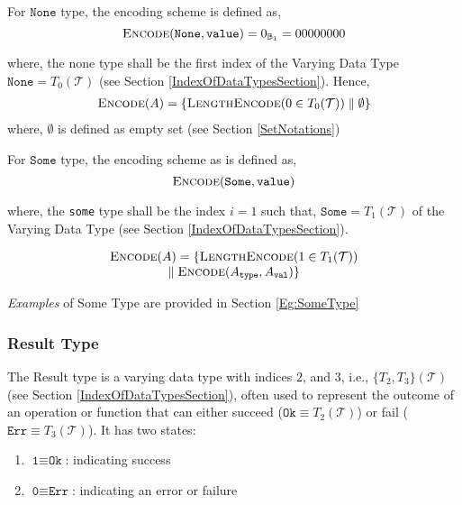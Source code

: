 \documentclass[../alan-handbook.tex]{subfiles}
\begin{document}
\label{NoneType}

For $\texttt{None}$ type, the encoding scheme is defined as,
$$\Call{Encode}{\texttt{None},\texttt{value}} = 0_{\mathbb{B}_1} = 00000000 $$

where, the none type shall be the first index of the Varying Data Type $\texttt{None} = T_0(\mathcal{T})$ (see Section \ref{IndexOfDataTypesSection}). Hence,
$$
\begin{matrix}
    \Call{Encode}{A} = \{\Call{LengthEncode}{0 \in T_0(\mathcal{T})} \parallel \emptyset\}
\end{matrix}
$$
where, $\emptyset$ is defined as empty set (see Section \ref{SetNotations})

\label{SomeType}

For $\texttt{Some}$ type, the encoding scheme as is defined as,
$$\Call{Encode}{\texttt{Some},\texttt{value}}$$

where, the \texttt{some} type shall be the index $i=1$ such that, $\texttt{Some} = T_1(\mathcal{T})$ of the Varying Data Type (see Section \ref{IndexOfDataTypesSection}). 

$$
\begin{matrix}
    \Call{Encode}{A} = \{\Call{LengthEncode}{1 \in T_{1}(\mathcal{T})} \\
    \parallel \Call{Encode}{A_{\texttt{type}},A_{\texttt{val}}}\}
\end{matrix}
$$

\textit{Examples} of Some Type are provided in Section \ref{Eg:SomeType}

\subsubsection{Result Type} 
\label{ResultType}

The Result type is a varying data type with indices $2$, and $3$, i.e., $\{T_2, T_3\}(\mathcal{T})$ (see Section \ref{IndexOfDataTypesSection}), often used to represent the outcome of an operation or function that can either succeed ($\texttt{Ok} \equiv T_2(\mathcal{T})$) or fail ($\texttt{Err} \equiv T_3(\mathcal{T})$). It has two states:

\begin{enumerate}
    \item $\texttt{1} \equiv \texttt{Ok}$: indicating success
    \item $\texttt{0} \equiv \texttt{Err}$: indicating an error or failure
\end{enumerate}
\end{document}
